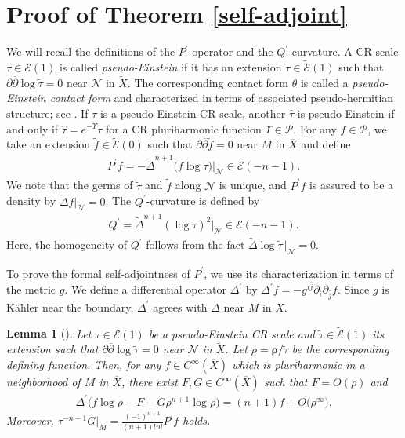 \documentclass[10pt,a4paper]{amsart}
\numberwithin{equation}{section}
\newtheorem{Lemma}[Theorem]{Lemma}
\begin{document}
\section{Proof of Theorem \ref{self-adjoint}}
We will recall the def\/initions of the $P^\prime$-operator and the $Q^\prime$-curvature. A CR scale $\tau\in\mathcal{E}(1)$ is called {\it pseudo-Einstein} if it has an extension $\widetilde\tau
\in\widetilde{\mathcal{E}}(1)$ such that $\partial\overline{\partial}\log\widetilde\tau=0$ near $\mathcal{N}$ in $\widetilde X$. The corresponding contact form $\theta$ is called a {\it pseudo-Einstein contact form} and characterized in terms of associated pseudo-hermitian structure; see \cite{Hirachi, Hirachi/Marugame/Matsumoto, Lee}. If $\tau$ is a pseudo-Einstein CR scale, another $\widehat\tau$ is pseudo-Einstein if and only if $\widehat\tau=e^{-\Upsilon}\tau$ for a CR pluriharmonic function $\Upsilon\in\mathcal{P}$. For any $f\in\mathcal{P}$, we take an extension
$\widetilde f\in\widetilde{\mathcal{E}}(0)$ such that $\partial\overline{\partial}\widetilde f=0$ near $M$ in $\overline X$ and def\/ine
\begin{gather*}
P^\prime f=-\widetilde\Delta^{n+1}\big(\widetilde f\log\widetilde\tau\big)|_\mathcal{N}\in\mathcal{E}(-n-1).
\end{gather*}
We note that the germs of $\widetilde\tau$ and $\widetilde f$ along $\mathcal{N}$ is unique, and $P^\prime f$ is assured to be a density by $\widetilde\Delta \widetilde f|_\mathcal{N}=0$. The $Q^\prime$-curvature is def\/ined by
\begin{gather*}
Q^\prime=\widetilde\Delta^{n+1}(\log\widetilde\tau)^2 |_\mathcal{N}\in\mathcal{E}(-n-1).
\end{gather*}
Here, the homogeneity of $Q^\prime$ follows from the fact $\widetilde\Delta\log\widetilde\tau\,|_\mathcal{N}=0$.

To prove the formal self-adjointness of $P^\prime$, we use its characterization in terms of the metric $g$. We def\/ine a dif\/ferential operator $\Delta^\prime$ by $\Delta^\prime f
=-g^{i\overline{j}}\partial_i\partial_{\overline{j}}f$. Since $g$ is K\"ahler near the boundary, $\Delta^\prime$ agrees with $\Delta$ near $M$ in $X$.

\begin{Lemma}[{\cite[Lemma 4.4]{Hirachi}}]\label{Delta}
Let $\tau\in\mathcal{E}(1)$ be a pseudo-Einstein CR scale and $\widetilde\tau\in\widetilde{\mathcal{E}}(1)$ its extension such that $\partial\overline{\partial}\log\widetilde\tau=0$ near $\mathcal{N}$ in $\widetilde X$. Let $\rho=\boldsymbol\rho/\widetilde\tau$ be the corresponding defining function. Then, for any $f\in C^\infty(\overline X)$ which is pluriharmonic in a neighborhood of $M$ in $\overline X$, there exist $F, G\in C^\infty(\overline X)$ such that $F=O(\rho)$ and
\begin{gather*}
\Delta^\prime \big(f\log\rho-F-G\rho^{n+1}\log\rho\big)=(n+1)f+O\big(\rho^\infty\big).
\end{gather*}
Moreover, ${\tau}^{-n-1}G|_M=\frac{(-1)^{n+1}}{(n+1)!n!}P^\prime f$ holds.
\end{Lemma}
\end{document}
